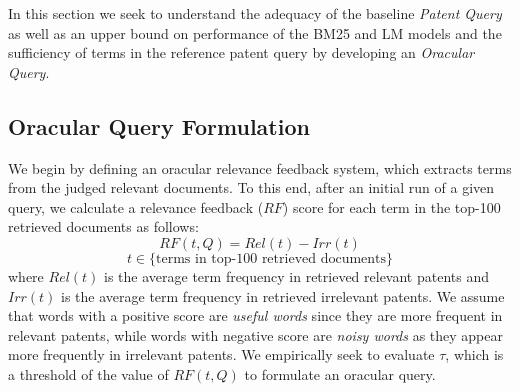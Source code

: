 %

In this section we seek to understand the adequacy of the baseline
\emph{Patent Query} as well as an upper bound on performance of the
BM25 and LM models and the sufficiency of terms in the reference patent query 
by developing an \emph{Oracular Query}.

\subsection{Oracular Query Formulation}

We begin by defining an oracular relevance feedback system, which
extracts terms from the judged relevant documents.  To this end, after an initial run of a given query, we
calculate a relevance feedback ($\mathit{RF}$) score for each term in the top-100
retrieved documents as follows:
\begin{equation}
RF(t,Q)=Rel(t)-Irr(t) 
 \label{eq:score}
\end{equation}\vspace*{-5ex}
\begin{displaymath}t\in \lbrace \mbox{terms in top-100 retrieved documents}\rbrace\end{displaymath}
where $ \mathit{Rel(t)} $ is the average term frequency in retrieved relevant patents and $ \mathit{Irr(t)} $ is the average term frequency in retrieved irrelevant patents. We assume that words with a positive score are \emph{ useful words} since they are more frequent in relevant patents, while words with negative score are \emph{ noisy words} as they appear more frequently in irrelevant patents. We empirically seek to evaluate $\tau$, which is a threshold of the value of $RF(t,Q)$ to formulate an oracular query.


